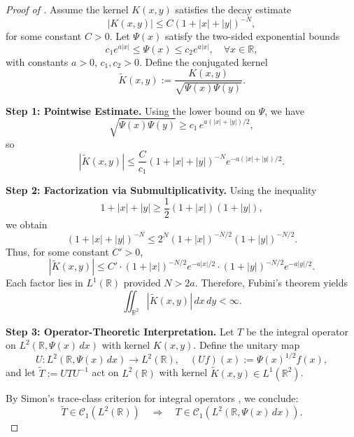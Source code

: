 \begin{proof}[Proof of ]
Assume the kernel \( K(x,y) \) satisfies the decay estimate
\[
|K(x,y)| \le C (1 + |x| + |y|)^{-N},
\]
for some constant \( C > 0 \). Let \( \Psi(x) \) satisfy the two-sided exponential bounds
\[
c_1 e^{a|x|} \le \Psi(x) \le c_2 e^{a|x|}, \quad \forall x \in \mathbb{R},
\]
with constants \( a > 0 \), \( c_1, c_2 > 0 \). Define the conjugated kernel
\[
\widetilde{K}(x,y) := \frac{K(x,y)}{\sqrt{\Psi(x)\Psi(y)}}.
\]

\medskip
\noindent\textbf{Step 1: Pointwise Estimate.}
Using the lower bound on \( \Psi \), we have
\[
\sqrt{\Psi(x)\Psi(y)} \ge c_1\, e^{a(|x| + |y|)/2},
\]
so
\[
|\widetilde{K}(x,y)| \le \frac{C}{c_1} (1 + |x| + |y|)^{-N} e^{-a(|x| + |y|)/2}.
\]

\medskip
\noindent\textbf{Step 2: Factorization via Submultiplicativity.}
Using the inequality
\[
1 + |x| + |y| \ge \frac{1}{2}(1 + |x|)(1 + |y|),
\]
we obtain
\[
(1 + |x| + |y|)^{-N} \le 2^N (1 + |x|)^{-N/2} (1 + |y|)^{-N/2}.
\]
Thus, for some constant \( C' > 0 \),
\[
|\widetilde{K}(x,y)| \le C' \cdot (1 + |x|)^{-N/2} e^{-a|x|/2} \cdot (1 + |y|)^{-N/2} e^{-a|y|/2}.
\]
Each factor lies in \( L^1(\mathbb{R}) \) provided \( N > 2a \). Therefore, Fubini’s theorem yields
\[
\iint_{\mathbb{R}^2} |\widetilde{K}(x,y)|\, dx\,dy < \infty.
\]

\medskip
\noindent\textbf{Step 3: Operator-Theoretic Interpretation.}
Let \( T \) be the integral operator on \( L^2(\mathbb{R}, \Psi(x)\,dx) \) with kernel \( K(x,y) \). Define the unitary map
\[
U \colon L^2(\mathbb{R}, \Psi(x)\,dx) \to L^2(\mathbb{R}), \quad (Uf)(x) := \Psi(x)^{1/2} f(x),
\]
and let \( \widetilde{T} := U T U^{-1} \) act on \( L^2(\mathbb{R}) \) with kernel \( \widetilde{K}(x,y) \in L^1(\mathbb{R}^2) \).

By Simon’s trace-class criterion for integral operators \cite[Thm.~4.2]{Simon2005TraceIdeals}, we conclude:
\[
\widetilde{T} \in \mathcal{C}_1(L^2(\mathbb{R})) \quad \Rightarrow \quad T \in \mathcal{C}_1(L^2(\mathbb{R}, \Psi(x)\,dx)).
\]
\end{proof}
